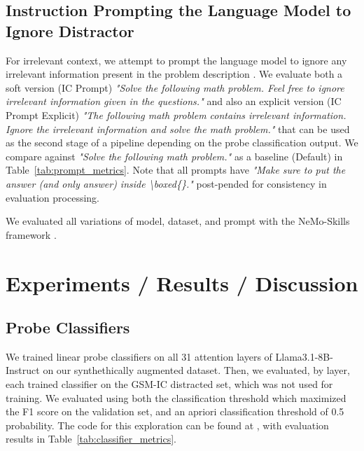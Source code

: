 \documentclass{article}
\begin{document}

\subsection{Instruction Prompting the Language Model to Ignore Distractor}

For irrelevant context, we attempt to prompt the language model to ignore any irrelevant information present in the problem description \citep{shi}. We evaluate both a soft version (IC Prompt) \textit{"Solve the following math problem. Feel free to ignore irrelevant information given in the questions."} and also an explicit version (IC Prompt Explicit) \textit{"The following math problem contains irrelevant information. Ignore the irrelevant information and solve the math problem."} that can be used as the second stage of a pipeline depending on the probe classification output. We compare against \textit{"Solve the following math problem."} as a baseline (Default) in Table~\ref{tab:prompt_metrics}. Note that all prompts have \textit{"Make sure to put the answer (and only answer) inside \textbackslash boxed\{\}."} post-pended for consistency in evaluation processing.

We evaluated all variations of model, dataset, and prompt with the NeMo-Skills framework \citep{toshniwal}.


\section{Experiments / Results / Discussion}



\subsection{Probe Classifiers}
We trained linear probe classifiers on all 31 attention layers of Llama3.1-8B-Instruct on our synthethically augmented dataset. Then, we evaluated, by layer, each trained classifier on the GSM-IC distracted set, which was not used for training. We evaluated using both the classification threshold which maximized the F1 score on the validation set, and an apriori classification threshold of 0.5 probability. The code for this exploration can be found at \citep{skzv2024mathlm}, with evaluation results in Table~\ref{tab:classifier_metrics}.
\end{document}
